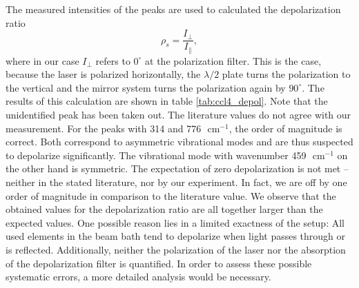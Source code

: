 The measured intensities of the peaks are used to calculated the depolarization ratio 
\begin{equation}
    \rho_s = \frac{I_\perp}{I_\parallel},   	
\end{equation}
where in our case $I_\perp$ refers to $0^\circ$ at the polarization filter. This is the case, because 
the laser is polarized horizontally, the $\lambda / 2$ plate turns the polarization to the vertical 
and the mirror system turns the polarization again by $90^\circ$. The results of this calculation 
are shown in table \ref{tab:ccl4_depol}. Note that the unidentified peak has been taken out. The
literature values do not agree with our measurement. For the peaks with 314 and 776 $\text{ cm}^{-1}$, 
the order of magnitude is correct. Both correspond to asymmetric vibrational modes and are thus suspected 
to depolarize significantly. The vibrational mode with wavenumber 459 $\text{ cm}^{-1}$ on the other 
hand is symmetric.\cite{zhang2012raman} 
The expectation of zero depolarization is not met -- neither in the stated literature, 
nor by our experiment. In fact, we are off by one order of magnitude in comparison to the literature value. 
We observe that the obtained values for the depolarization ratio are all together larger than the 
expected values. One possible reason lies in a limited exactness of the setup: All used elements in the 
beam bath tend to depolarize when light passes through or is reflected. Additionally, neither the 
polarization of the laser nor the absorption of the depolarization filter is quantified. 
In order to assess these possible systematic errors, a more detailed analysis would be necessary. 

